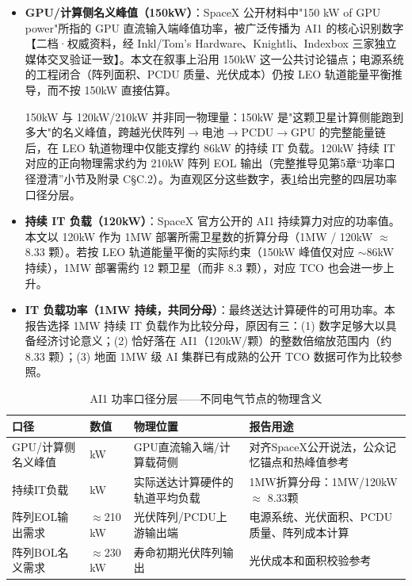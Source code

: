 \begin{itemize}[leftmargin=*]
    \item \textbf{GPU/计算侧名义峰值（150\;kW）}：SpaceX 公开材料中"150 kW of GPU power"所指的 GPU 直流输入端峰值功率，被广泛传播为 AI1 的核心识别数字【二档·权威资料，经 Inkl/Tom's Hardware、Knightli、Indexbox 三家独立媒体交叉验证一致】\cite{spacex2026ai1}。本文在叙事上沿用 150\;kW 这一公共讨论锚点；电源系统的工程闭合（阵列面积、PCDU 质量、光伏成本）仍按 LEO 轨道能量平衡推导，而不按 150\;kW 直接估算。

          150\;kW 与 120\;kW/210\;kW 并非同一物理量：150\;kW 是"这颗卫星计算侧能跑到多大"的名义峰值，跨越光伏阵列$\to$电池$\to$PCDU$\to$GPU 的完整能量链后，在 LEO 轨道物理中仅能支撑约 86\;kW 的持续 IT 负载。120\;kW 持续 IT 对应的正向物理需求约为 210\;kW 阵列 EOL 输出（完整推导见第5章“功率口径澄清”小节及附录 C\;\S C.2）。为直观区分这些数字，表\ref{tab:power_layers}给出完整的四层功率口径分层。
    \item \textbf{持续 IT 负载（120\;kW）}：SpaceX 官方公开的 AI1 持续算力对应的功率值\cite{spacex2026ai1}。本文以 120\;kW 作为 1\;MW 部署所需卫星数的折算分母（1\;MW / 120\;kW $\approx$ 8.33 颗）。若按 LEO 轨道能量平衡的实际约束（150\;kW 峰值仅对应 $\sim$86\;kW 持续），1\;MW 部署需约 12 颗卫星（而非 8.3 颗），对应 TCO 也会进一步上升。
    \item \textbf{IT 负载功率（1\;MW 持续，共同分母）}：最终送达计算硬件的可用功率。本报告选择 1\;MW 持续 IT 负载作为比较分母，原因有三：(1) 数字足够大以具备经济讨论意义；(2) 恰好落在 AI1（120\;kW/颗）的整数倍缩放范围内（约 8.33 颗）；(3) 地面 1\;MW 级 AI 集群已有成熟的公开 TCO 数据可作为比较参照。
\end{itemize}

\begin{table}[H]
\centering
\caption{AI1 功率口径分层——不同电气节点的物理含义}
\label{tab:power_layers}
\footnotesize
\begin{tabular}{p{3.8cm}>{\centering\arraybackslash}p{2.0cm}p{3.0cm}p{4.0cm}}
\toprule
\textbf{口径} & \textbf{数值} & \textbf{物理位置} & \textbf{报告用途} \\
\midrule
GPU/计算侧名义峰值 & 150 kW & GPU直流输入端/计算载荷侧 & 对齐SpaceX公开说法，公众记忆锚点和热峰值参考 \\
持续IT负载 & 120 kW & 实际送达计算硬件的轨道平均负载 & 1MW折算分母：1MW/120kW $\approx$ 8.33颗 \\
阵列EOL输出需求 & $\approx$210 kW & 光伏阵列/PCDU上游输出端 & 电源系统、光伏面积、PCDU质量、阵列成本计算 \\
阵列BOL名义需求 & $\approx$230 kW & 寿命初期光伏阵列输出 & 光伏成本和面积校验参考 \\
\bottomrule
\end{tabular}
\end{table}

